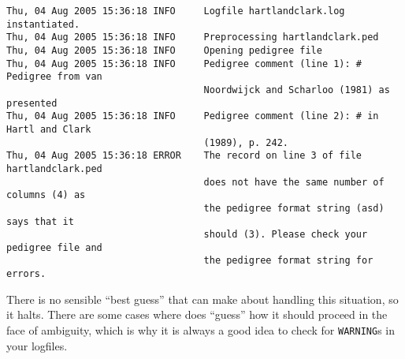 \begin{verbatim}
Thu, 04 Aug 2005 15:36:18 INFO     Logfile hartlandclark.log instantiated.
Thu, 04 Aug 2005 15:36:18 INFO     Preprocessing hartlandclark.ped
Thu, 04 Aug 2005 15:36:18 INFO     Opening pedigree file
Thu, 04 Aug 2005 15:36:18 INFO     Pedigree comment (line 1): # Pedigree from van
                                   Noordwijck and Scharloo (1981) as presented
Thu, 04 Aug 2005 15:36:18 INFO     Pedigree comment (line 2): # in Hartl and Clark
                                   (1989), p. 242.
Thu, 04 Aug 2005 15:36:18 ERROR    The record on line 3 of file hartlandclark.ped
                                   does not have the same number of columns (4) as
                                   the pedigree format string (asd) says that it
                                   should (3). Please check your pedigree file and
                                   the pedigree format string for errors.
\end{verbatim}
There is no sensible ``best guess'' that \PyPedal{} can make about handling this situation, so it halts.  There are some cases where \PyPedal{} does ``guess'' how it should proceed in the face of ambiguity, which is why it is always a good idea to check for \texttt{WARNING}s in your logfiles.